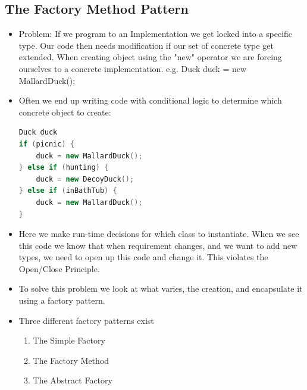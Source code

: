 \documentclass[11pt]{article}
\begin{document}
    \subsection{The Factory Method Pattern}
    \begin{itemize}
        \item Problem: If we program to an Implementation we get locked into a specific type. Our code then needs modification if
        our set of concrete type get extended. When creating object using the "new" operator we are forcing ourselves
        to a concrete implementation. e.g. Duck duck = new MallardDuck();
        \item Often we end up writing code with conditional logic to determine which concrete object to create:
        \begin{lstlisting}[language=C++]
Duck duck
if (picnic) {
    duck = new MallardDuck();
} else if (hunting) {
    duck = new DecoyDuck();
} else if (inBathTub) {
    duck = new MallardDuck();
}
        \end{lstlisting}
        \item Here we make run-time decisions for which class to instantiate. When we see this code we know that when
        requirement changes, and we want to add new types, we need to open up this code and change it. This violates
        the Open/Close Principle.
        \item To solve this problem we look at what varies, the creation, and encapsulate it using a factory pattern.
        \item Three different factory patterns exist
        \begin{enumerate}
            \item The Simple Factory
            \item The Factory Method
            \item The Abstract Factory
        \end{enumerate}

\end{itemize}
\end{document}

